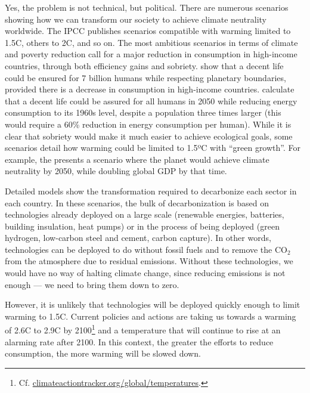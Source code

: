 \documentclass[a5paper,english,openany]{memoir}
\begin{document}
Yes, the problem is not technical, but political. There are numerous scenarios showing how we can transform our society to achieve climate neutrality worldwide. The IPCC publishes scenarios compatible with warming limited to 1.5\textdegree{}C, others to 2\textdegree{}C, and so on. The most ambitious scenarios in terms of climate and poverty reduction call for a major reduction in consumption in high-income countries, through both efficiency gains and sobriety. \cite{oneill_good_2018,hickel_is_2019} show that a decent life could be ensured for 7 billion humans while respecting planetary boundaries, provided there is a decrease in consumption in high-income countries. \cite{millward-hopkins_providing_2020} calculate that a decent life could be assured for all humans in 2050 while reducing energy consumption to its 1960s level, despite a population three times larger (this would require a 60\% reduction in energy consumption per human). While it is clear that sobriety would make it much easier to achieve ecological goals, some scenarios detail how warming could be limited to 1.5ºC with ``green growth''. For example, the \cite{international_energy_agency_net_2023} presents a scenario where the planet would achieve climate neutrality by 2050, while doubling global GDP by that time. 

Detailed models show the transformation required to decarbonize each sector in each country. In these scenarios, the bulk of decarbonization is based on technologies already deployed on a large scale (renewable energies, batteries, building insulation, heat pumps) or in the process of being deployed (green hydrogen, low-carbon steel and cement, carbon capture). In other words, technologies can be deployed to do without fossil fuels and to remove the CO$_\text{2}$ from the atmosphere due to residual emissions. Without these technologies, we would have no way of halting climate change, since reducing emissions is not enough --- we need to bring them down to zero. 

However, it is unlikely that technologies will be deployed quickly enough to limit warming to 1.5\textdegree{}C. Current policies and actions are taking us towards a warming of 2.6\textdegree{}C to 2.9\textdegree{}C by 2100\footnote{Cf. \href{https://climateactiontracker.org/global/temperatures/}{climateactiontracker.org/global/temperatures}.} and a temperature that will continue to rise at an alarming rate after 2100. In this context, the greater the efforts to reduce consumption, the more warming will be slowed down. 
\end{document}
